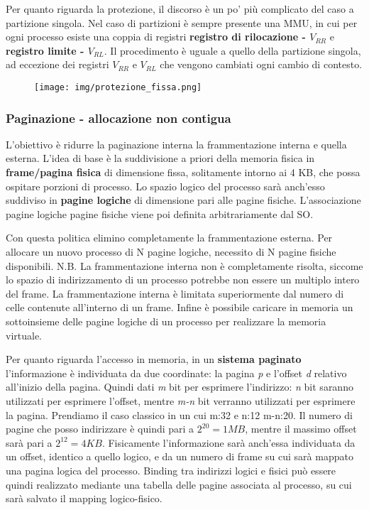 \documentclass{article}
\begin{document}
\noindent Per quanto riguarda la protezione, il discorso è un po' più complicato del caso a partizione singola. Nel caso di partizioni è sempre presente una
 MMU, in cui per ogni processo esiste una coppia di registri \textbf{registro di rilocazione - $V_{RR}$} e \textbf{registro limite - $V_{RL}$}. Il procedimento è uguale 
 a quello della partizione singola, ad eccezione dei registri $V_{RR}$ e $V_{RL}$ che vengono cambiati ogni cambio di contesto.   
 
 \begin{figure}[h!]
    \begin{center}
        \texttt{[image: img/protezione\_fissa.png]}     
    \end{center}
\end{figure}

\subsubsection{Paginazione - allocazione non contigua}
\noindent L'obiettivo è ridurre la paginazione interna la frammentazione interna e quella esterna. L'idea di base è la suddivisione a priori della memoria fisica in 
\textbf{frame/pagina fisica} di dimensione fissa, solitamente intorno ai 4 KB, che possa ospitare porzioni di processo. Lo spazio logico del processo sarà anch'esso suddiviso 
in \textbf{pagine logiche} di dimensione pari alle pagine fisiche. L'associazione pagine logiche pagine fisiche viene poi definita arbitrariamente dal SO.

\noindent Con questa politica elimino completamente la frammentazione esterna. Per allocare un nuovo processo di N pagine logiche, necessito di N pagine fisiche disponibili.
N.B. La frammentazione interna non è completamente risolta, siccome lo spazio di indirizzamento di un processo potrebbe non essere un multiplo intero del frame. 
La frammentazione interna è limitata superiormente dal numero di celle contenute all'interno di un frame. Infine è possibile caricare in memoria un sottoinsieme delle pagine 
logiche di un processo per realizzare la memoria virtuale.

\noindent Per quanto riguarda l'accesso in memoria, in un \textbf{sistema paginato} l'informazione è individuata da due coordinate: la pagina \textit{p} e 
l'offset \textit{d} relativo all'inizio della pagina. Quindi dati \textit{m} bit per esprimere l'indirizzo: \textit{n} bit saranno utilizzati per esprimere l'offset,
mentre \textit{m-n} bit verranno utilizzati per esprimere la pagina. Prendiamo il caso classico in un cui m:32 e n:12 m-n:20. Il numero di pagine che posso indirizzare è quindi
pari a $2^{20}=1MB$, mentre il massimo offset sarà pari a $2^{12}=4KB$.
Fisicamente l'informazione sarà anch'essa individuata da un offset, identico a quello logico, e da un numero di frame su cui sarà mappato una pagina logica del processo.
Binding tra indirizzi logici e fisici può essere quindi realizzato mediante una tabella delle pagine associata al processo, su cui sarà salvato il mapping logico-fisico.
\end{document}
